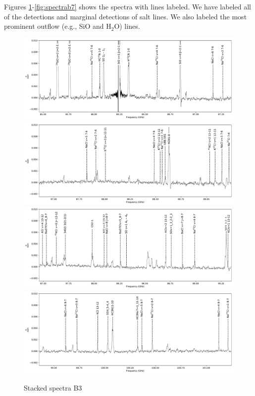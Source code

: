 \documentclass[twocolumn]{aastex62}
\begin{document}
Figures \ref{fig:spectrab3}-\ref{fig:spectrab7} shows the spectra with lines labeled.  We have labeled all of the
detections and marginal detections of salt lines.  We also labeled the most
prominent outflow (e.g., SiO and H$_2$O) lines.

\begin{figure}[!htp]
\includegraphics[scale=1,width=5.5in]{figures/lines_labeled_OrionSourceI_B3_spw0_robust0.5.pdf}
\includegraphics[scale=1,width=5.5in]{figures/lines_labeled_OrionSourceI_B3_spw1_robust0.5.pdf}
\includegraphics[scale=1,width=5.5in]{figures/lines_labeled_OrionSourceI_B3_spw2_robust0.5.pdf}
\includegraphics[scale=1,width=5.5in]{figures/lines_labeled_OrionSourceI_B3_spw3_robust0.5.pdf}
\caption{Stacked spectra  B3}
\label{fig:spectrab3}
\end{figure}
\end{document}
